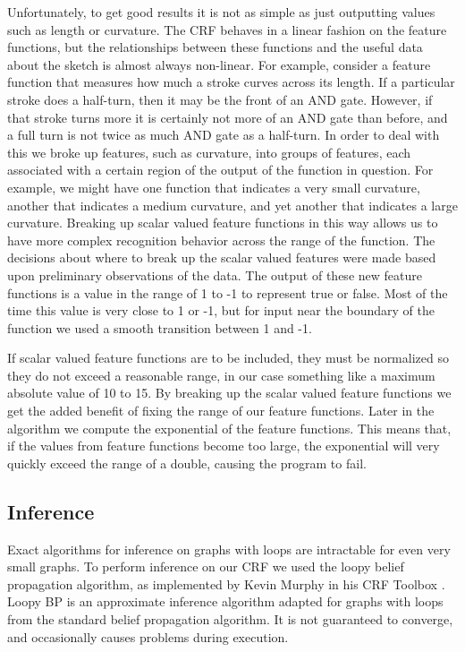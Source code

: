\documentclass[10pt]{acmsiggraph}               %
\begin{document}
Unfortunately, to get good results it is not as simple as just outputting values such as length or curvature. The CRF behaves in a linear fashion on the feature functions, but the relationships between these functions and the useful data about the sketch is almost always non-linear. For example, consider a feature function that measures how much a stroke curves across its length.  If a particular stroke does a half-turn, then it may be the front of an AND gate. However, if that stroke turns more it is certainly not more of an AND gate than before, and a full turn is not twice as much AND gate as a half-turn. In order to deal with this we broke up features, such as curvature, into groups of features, each associated with a certain region of the output of the function in question. For example, we might have one function that indicates a very small curvature, another that indicates a medium curvature, and yet another that indicates a large curvature. Breaking up scalar valued feature functions in this way allows us to have more complex recognition behavior across the range of the function. The decisions about where to break up the scalar valued features were made based upon preliminary observations of the data. The output of these new feature functions is a value in the range of 1 to -1 to represent true or false. Most of the time this value is very close to 1 or -1, but for input near the boundary of the function we used a smooth transition between 1 and -1.

If scalar valued feature functions are to be included, they must be normalized so they do not exceed a reasonable range, in our case something like a maximum absolute value of 10 to 15. By breaking up the scalar valued feature functions we get the added benefit of fixing the range of our feature functions.  Later in the algorithm we compute the exponential of the feature functions. This means that, if the values from feature functions become too large, the exponential will very quickly exceed the range of a double, causing the program to fail. 

\subsection{Inference}
Exact algorithms for inference on graphs with loops are intractable for even very small graphs.  To perform inference on our CRF we used the loopy belief propagation algorithm, as implemented by Kevin Murphy in his CRF Toolbox \cite{murphy:CRF}. Loopy BP is an approximate inference algorithm adapted for graphs with loops from the standard belief propagation algorithm. It is not guaranteed to converge, and occasionally causes problems during execution. 
\end{document}
